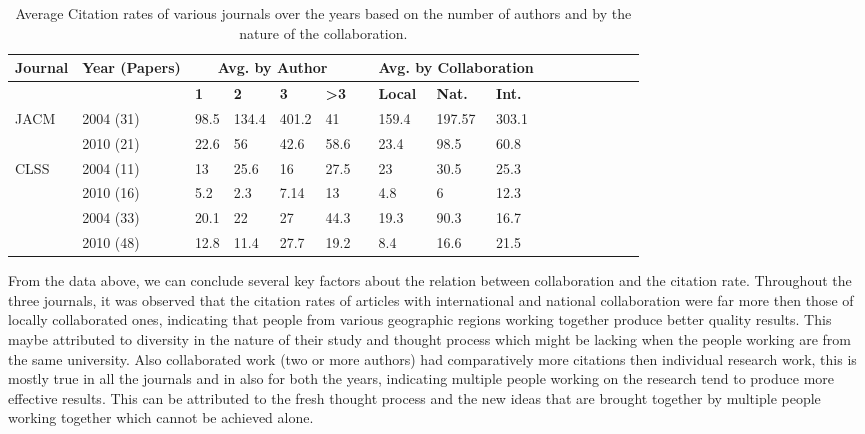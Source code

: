 \documentclass[12pt]{article}
\begin{document}
\begin{table}[htdp]
\begin{tabular*}{\linewidth}{@{\extracolsep{\fill}}lllllllllllllllll@{}}

  \toprule
  \midrule
  \textbf{Journal} & \textbf{Year (Papers)} &\multicolumn{4}{c}{\textbf{Avg. by Author}} & & \multicolumn{3}{c}{\textbf{Avg. by Collaboration}} \\
  \midrule \addlinespace
  && \textbf{1} & \textbf{2} & \textbf{3} & \textbf{\textgreater 3} & & \textbf{Local} & \textbf{Nat.} & \textbf{Int.} & \\
    \midrule
  \multirow{2}{*}{JACM} & 2004 (31) & 98.5 & 134.4 & 401.2 & 41 && 159.4 &  197.57 & 303.1 \\
  & 2010 (21) & 22.6 & 56 & 42.6 & 58.6 && 23.4 & 98.5 & 60.8\\
  \midrule
  \multirow{3}{*}{CLSS} & 2004 (11) & 13 & 25.6 & 16 & 27.5 && 23 &  30.5 & 25.3 \\
  & 2010 (16) & 5.2 & 2.3 & 7.14 & 13 && 4.8 & 6 & 12.3\\
  \midrule
  \multirow{3}{*}{JLC} & 2004 (33) & 20.1 & 22 & 27 & 44.3 && 19.3 &  90.3 & 16.7 \\
  & 2010 (48) & 12.8 & 11.4 & 27.7 & 19.2 && 8.4 & 16.6 & 21.5\\
  \bottomrule

\end{tabular*}
\caption{Average Citation rates of various journals over the years based on the number of authors and by the nature of the collaboration.}
\label{citation comparison}
\end{table}

\noindent
From the data above, we can conclude several key factors about the relation between collaboration and the citation rate. Throughout the three journals, it was observed that the citation rates of articles with international and national collaboration were far more then those of locally collaborated ones, indicating that people from various geographic regions working together produce better quality results. This maybe attributed to diversity in the nature of their study and thought process which might be lacking when the people working are from the same university. Also collaborated work (two or more authors) had comparatively more citations then individual research work, this is mostly true in all the journals and in also for both the years, indicating multiple people working on the research tend to produce more effective results. This can be attributed to the fresh thought process and the new ideas that are brought together by multiple people working together which cannot be achieved alone. 
\end{document}
